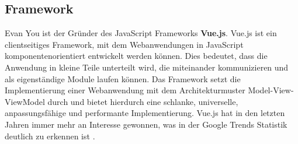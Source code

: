 \subsection{Framework}
Evan You ist der Gr\"under des JavaScript Frameworks \textbf{Vue.js}\cite{Springer2017}. Vue.js ist ein clientseitiges Framework, mit dem Webanwendungen in JavaScript komponentenorientiert entwickelt werden k\"onnen. Dies bedeutet, dass die Anwendung in kleine Teile unterteilt wird, die miteinander kommunizieren und als eigenst\"andige Module laufen k\"onnen. Das Framework setzt die Implementierung einer Webanwendung mit dem Architekturmuster Model-View-ViewModel durch und bietet hierdurch eine schlanke, universelle, anpassungsf\"ahige und performante Implementierung\cite{Teufel2018}. Vue.js hat in den letzten Jahren immer mehr an Interesse gewonnen, was in der Google Trends Statistik deutlich zu erkennen ist \cite{GoogleTrends2018}.
